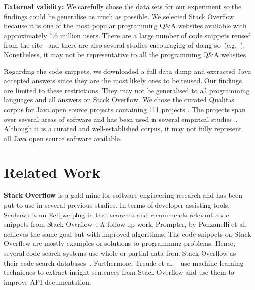 \documentclass[10pt,journal,compsoc]{IEEEtran}
\begin{document}

\textbf{External validity:} We carefully chose the data sets for our
experiment so the findings could be generalise as much as possible.
We selected Stack Overflow because it is one of the most popular
programming Q\&A websites available with approximately 7.6 million
users. There are a large number of code snippets reused from the
site~\cite{An2017} and there are also several studies encouraging of
doing
so~(e.g.~\cite{Ponzanelli2013,Ponzanelli2014,Keivanloo2014,Park2014}).
Nonetheless, it may not be representative to all the programming Q\&A
websites.

Regarding the code snippets, we downloaded a full data dump and
extracted Java accepted answers
since they are the
most likely ones to be reused. 
Our findings are limited to these restrictions. They may
not be generalised to all programming languages and all answers on
Stack Overflow. We chose the curated Qualitas
corpus for Java open source projects containing 111 projects
\cite{QualitasCorpus}.  The projects span over several areas of
software and has been used in several empirical
studies~\cite{Taube-Schock2011,Beckman2011,Vasilescu2011,Omar2012}. Although
it is a curated and well-established corpus, it may not fully
represent all Java open source software available.


\section{Related Work}

\textbf{Stack Overflow} is a gold mine for software engineering
research and
has been put to
use in several previous studies. In terms of developer-assisting
tools, Seahawk is an Eclipse plug-in that searches and recommends
relevant code snippets from Stack Overflow~\cite{Ponzanelli2013}. A
follow up work, Prompter, by Ponzanelli et al.~\cite{Ponzanelli2014}
achieves the same goal but with improved algorithms. The code snippets
on Stack Overflow are mostly examples or solutions to programming
problems. Hence, several code search systems use whole or partial data
from Stack Overflow as their code search
databases~\cite{Keivanloo2014,Park2014,
	Stolee2014,Subramanian2013,Diamantopoulos2015}. Furthermore, Treude
et al.~\cite{Treude2016}~use machine learning techniques to extract
insight sentences from Stack Overflow and use them to improve API
documentation.
\end{document}

